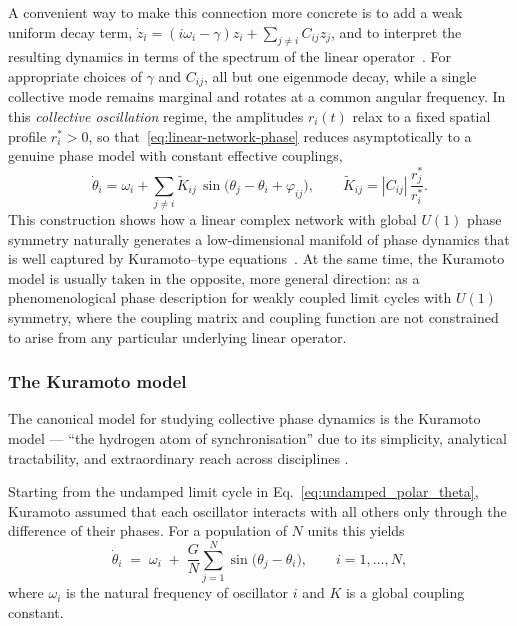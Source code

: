 \documentclass[12pt]{article}
\numberwithin{equation}{section}
\begin{document}
A convenient way to make this connection more concrete is to add a weak uniform decay term, $\dot z_i = (i\omega_i - \gamma) z_i + \sum_{j\neq i} C_{ij}z_j$, and to interpret the resulting dynamics in terms of the spectrum of the linear operator~\cite{Roberts2008,Conteville2013}. For appropriate choices of $\gamma$ and $C_{ij}$, all but one eigenmode decay, while a single collective mode remains marginal and rotates at a common angular frequency. In this \emph{collective oscillation} regime, the amplitudes $r_i(t)$ relax to a fixed spatial profile $r_i^\ast>0$, so that~\eqref{eq:linear-network-phase} reduces asymptotically to a genuine phase model with constant effective couplings,
\begin{equation}
    \dot\theta_i
    =
    \omega_i
    +
    \sum_{j\neq i}
      \tilde K_{ij}\,
      \sin\!\bigl(\theta_j-\theta_i+\varphi_{ij}\bigr),
    \qquad
    \tilde K_{ij} = |C_{ij}|\,\frac{r_j^\ast}{r_i^\ast}.
    \label{eq:kuramoto-effective-coupling}
\end{equation}
This construction shows how a linear complex network with global $U(1)$ phase symmetry naturally generates a low‑dimensional manifold of phase dynamics that is well captured by Kuramoto–type equations~\cite{Kuramoto1984,Nakao2016,Pietras2019}. At the same time, the Kuramoto model is usually taken in the opposite, more general direction: as a phenomenological phase description for weakly coupled limit cycles with $U(1)$ symmetry, where the coupling matrix and coupling function are not constrained to arise from any particular underlying linear operator.




\subsubsection{The Kuramoto model}
 

The canonical model for studying collective phase dynamics is the Kuramoto model ---  “the hydrogen atom of synchronisation” due to its simplicity, analytical tractability, and extraordinary reach across disciplines 
\cite{kuramotoSelfentrainmentPopulationCoupled1975,Winfree2001,strogatz_nonlinear_2015,acebronKuramotoModelSimple2005}. %

Starting from the undamped limit cycle in Eq.~\eqref{eq:undamped_polar_theta}, Kuramoto assumed that each oscillator interacts with all others only through the difference of their phases.  For a population of $N$ units this yields  
\begin{equation}
    \dot{\theta}_{i}
    \;=\;
    \omega_{i}
    \;+\;
    \frac{G}{N}
    \sum_{j=1}^{N}
    \sin\!\bigl(\theta_{j}-\theta_{i}\bigr),
    \qquad
    i=1,\dots,N,
    \label{eq:kuramoto_original}
\end{equation}
where $\omega_{i}$ is the natural frequency of oscillator $i$ and $K$ is a global coupling constant.
\end{document}
